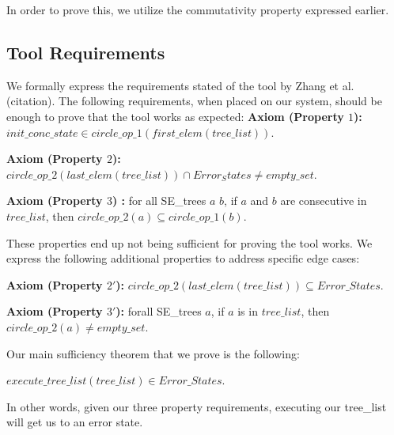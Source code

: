 In order to prove this, we utilize the commutativity property expressed earlier.


\subsection{Tool Requirements}
We formally express the requirements stated of the tool by Zhang et al. (citation).
The following requirements, when placed on our system, should be enough to prove that the tool works as expected:
\textbf{Axiom (Property $1$):} 
$init\_conc\_state \in circle\_op\_1 (first\_elem (tree\_list))$.

\textbf{Axiom (Property $2$):}
$ circle\_op\_2 (last\_elem (tree\_list)) \cap Error_States 
\neq empty\_set $.

\textbf{Axiom (Property $3$) :} 
for all SE\_trees $a$ $b$, 
if $a$ and $b$ are consecutive in $tree\_list$, then 
$circle\_op\_2 (a) \subseteq
circle\_op\_1 (b) $.

These properties end up not being sufficient for proving the tool works. 
We express the following additional properties to address specific edge cases:

\textbf{Axiom (Property $2'$):}
$circle\_op\_2 (last\_elem (tree\_list))
\subseteq Error\_States $.

\textbf{Axiom (Property $3'$):}
forall SE\_trees $a$, 
if $a$ is in $tree\_list$, then
$circle\_op\_2 (a) \neq empty\_set$.


Our main sufficiency theorem that we prove is the following:
\begin{theorem}
$execute\_tree\_list (tree\_list) \in Error\_States$.
\end{theorem}
 In other words, given our three property requirements, executing our tree\_list will get us to an error state.